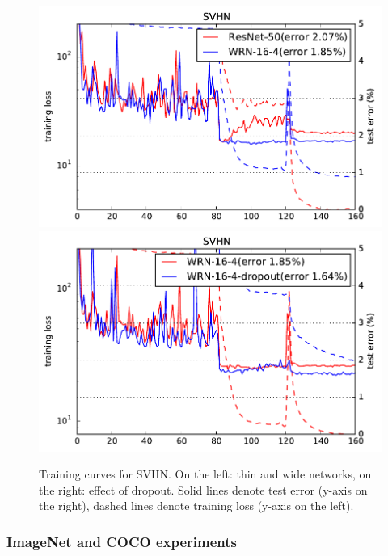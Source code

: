 \documentclass{bmvc2k}
\begin{document}
\begin{figure}
  \centering
  \vspace{0.1cm}
  \includegraphics[scale=0.42]{./images/svhn.pdf}
  \includegraphics[scale=0.42]{./images/svhn-dropout.pdf}
  \caption{Training curves for SVHN. On the left: thin and wide networks, on the right: effect of dropout. Solid lines denote test error (y-axis on the right), dashed lines denote training loss (y-axis on the left).}
  \label{fig:dropout-svhn}
\end{figure}


\subsubsection*{ImageNet and COCO experiments}
\end{document}
